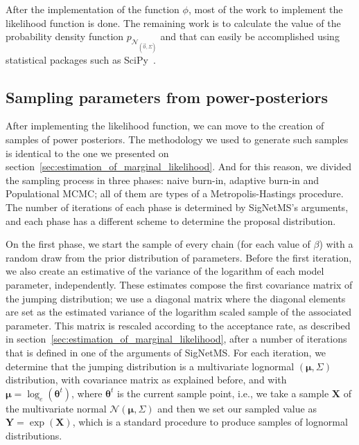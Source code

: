 After the implementation of the function $\phi$, most of the work to
implement the likelihood function is done. The remaining work is to
calculate the value of the probability density function
$p_{\mathcal{N}_{\left(\vec{0}, \Sigma\right)}}$ and that can easily be
accomplished using statistical packages such as
SciPy~\cite{2020SciPy-NMeth}.

\subsection{Sampling parameters from power-posteriors}

After implementing the likelihood function, we can move to the creation
of samples of power posteriors. The methodology we used to generate such
samples is identical to the one we presented on
section~\ref{sec:estimation_of_marginal_likelihood}. And for this
reason, we divided the sampling process in three phases: naive burn-in,
adaptive burn-in and Populational MCMC; all of them are types of a 
Metropolis-Hastings procedure. The number of iterations of each phase is
determined by SigNetMS's arguments, and each phase has a different 
scheme to determine the proposal distribution.

On the first phase, we start the sample of every chain (for each value
of $\beta$) with a random draw from the prior distribution of
parameters. Before the first iteration, we also create an estimative of
the variance of the logarithm of each model parameter, independently.
These estimates compose the first covariance matrix of the jumping 
distribution; we use a diagonal matrix where the diagonal elements are
set as the estimated variance of the logarithm scaled sample of the
associated parameter. This matrix is rescaled according to the
acceptance rate, as described in
section~\ref{sec:estimation_of_marginal_likelihood}, after a number of
iterations that is defined in one of the arguments of SigNetMS. For each
iteration, we determine that the jumping distribution is a multivariate
lognormal $({\bm \mu}, \Sigma)$ distribution, with covariance matrix as
explained before, and with ${\bm \mu} = \log_e({\bm \theta}^t)$, where
${\bm \theta}^t$ is the current sample point, i.e., we take a
sample ${\bm X}$ of the multivariate normal $\mathcal{N}({\bm \mu},
\Sigma)$ and then we set our sampled value  as ${\bm Y} = \exp({\bm
X})$, which is a standard procedure to produce samples of lognormal
distributions.

